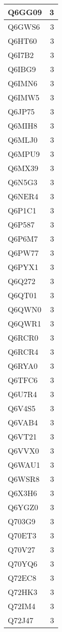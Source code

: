 \documentclass[
]{book}
\theoremstyle{definition}
\theoremstyle{definition}
\theoremstyle{definition}
\theoremstyle{definition}
\theoremstyle{remark}
\begin{document}
\begin{table}
\begin{tabular}{l|r}
\hline
Q6GG09 & 3\\
\hline
Q6GWS6 & 3\\
\hline
Q6HT60 & 3\\
\hline
Q6I7B2 & 3\\
\hline
Q6IBG9 & 3\\
\hline
Q6IMN6 & 3\\
\hline
Q6IMW5 & 3\\
\hline
Q6JP75 & 3\\
\hline
Q6MIH8 & 3\\
\hline
Q6MLJ0 & 3\\
\hline
Q6MPU9 & 3\\
\hline
Q6MX39 & 3\\
\hline
Q6N5G3 & 3\\
\hline
Q6NER4 & 3\\
\hline
Q6P1C1 & 3\\
\hline
Q6P587 & 3\\
\hline
Q6P6M7 & 3\\
\hline
Q6PW77 & 3\\
\hline
Q6PYX1 & 3\\
\hline
Q6Q272 & 3\\
\hline
Q6QT01 & 3\\
\hline
Q6QWN0 & 3\\
\hline
Q6QWR1 & 3\\
\hline
Q6RCR0 & 3\\
\hline
Q6RCR4 & 3\\
\hline
Q6RYA0 & 3\\
\hline
Q6TFC6 & 3\\
\hline
Q6U7R4 & 3\\
\hline
Q6V4S5 & 3\\
\hline
Q6VAB4 & 3\\
\hline
Q6VT21 & 3\\
\hline
Q6VVX0 & 3\\
\hline
Q6WAU1 & 3\\
\hline
Q6WSR8 & 3\\
\hline
Q6X3H6 & 3\\
\hline
Q6YGZ0 & 3\\
\hline
Q703G9 & 3\\
\hline
Q70ET3 & 3\\
\hline
Q70V27 & 3\\
\hline
Q70YQ6 & 3\\
\hline
Q72EC8 & 3\\
\hline
Q72HK3 & 3\\
\hline
Q72IM4 & 3\\
\hline
Q72J47 & 3\\

\end{tabular}
\end{table}
\end{document}
